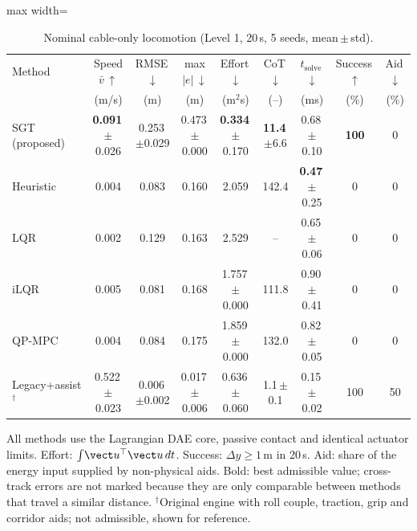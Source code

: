 \begin{table}[t]
\centering
\caption{Nominal cable-only locomotion (Level 1, 20\,s, 5 seeds, mean\,$\pm$\,std).}
\label{tab:nominal}
\setlength{\tabcolsep}{3.2pt}
\renewcommand{\arraystretch}{1.08}
\footnotesize
\begin{adjustbox}{max width=\textwidth}
\begin{tabular}{@{}lcccccccc@{}}
\toprule
Method & Speed $\bar v$\,$\uparrow$ & RMSE\,$\downarrow$ & max $|e|$\,$\downarrow$ & Effort\,$\downarrow$ & CoT\,$\downarrow$ & $t_{\mathrm{solve}}$\,$\downarrow$ & Success\,$\uparrow$ & Aid\,$\downarrow$ \\
 & {\scriptsize (m/s)} & {\scriptsize (m)} & {\scriptsize (m)} & {\scriptsize (m$^2$s)} & {\scriptsize (--)} & {\scriptsize (ms)} & {\scriptsize (\%)} & {\scriptsize (\%)} \\
\midrule
SGT (proposed) & \textbf{0.091}\,{\scriptsize$\pm$0.026} & 0.253\,{\scriptsize$\pm$0.029} & 0.473\,{\scriptsize$\pm$0.000} & \textbf{0.334}\,{\scriptsize$\pm$0.170} & \textbf{11.4}\,{\scriptsize$\pm$6.6} & 0.68\,{\scriptsize$\pm$0.10} & \textbf{100} & 0 \\
Heuristic & 0.004 & 0.083 & 0.160 & 2.059 & 142.4 & \textbf{0.47}\,{\scriptsize$\pm$0.25} & 0 & 0 \\
LQR & 0.002 & 0.129 & 0.163 & 2.529 & -- & 0.65\,{\scriptsize$\pm$0.06} & 0 & 0 \\
iLQR & 0.005 & 0.081 & 0.168 & 1.757\,{\scriptsize$\pm$0.000} & 111.8 & 0.90\,{\scriptsize$\pm$0.41} & 0 & 0 \\
QP-MPC & 0.004 & 0.084 & 0.175 & 1.859\,{\scriptsize$\pm$0.000} & 132.0 & 0.82\,{\scriptsize$\pm$0.05} & 0 & 0 \\
Legacy+assist$^\dagger$ & 0.522\,{\scriptsize$\pm$0.023} & 0.006\,{\scriptsize$\pm$0.002} & 0.017\,{\scriptsize$\pm$0.006} & 0.636\,{\scriptsize$\pm$0.060} & 1.1\,{\scriptsize$\pm$0.1} & 0.15\,{\scriptsize$\pm$0.02} & 100 & 50 \\
\bottomrule
\end{tabular}
\end{adjustbox}
\par\vspace{3pt}\parbox{\textwidth}{\scriptsize\raggedright All methods use the Lagrangian DAE core, passive contact and identical actuator limits. Effort: $\int\!\vect u^{\top}\vect u\,dt$. Success: $\Delta y \ge 1$\,m in 20\,s. Aid: share of the energy input supplied by non-physical aids. Bold: best admissible value; cross-track errors are not marked because they are only comparable between methods that travel a similar distance. $^\dagger$Original engine with roll couple, traction, grip and corridor aids; not admissible, shown for reference.}
\end{table}

